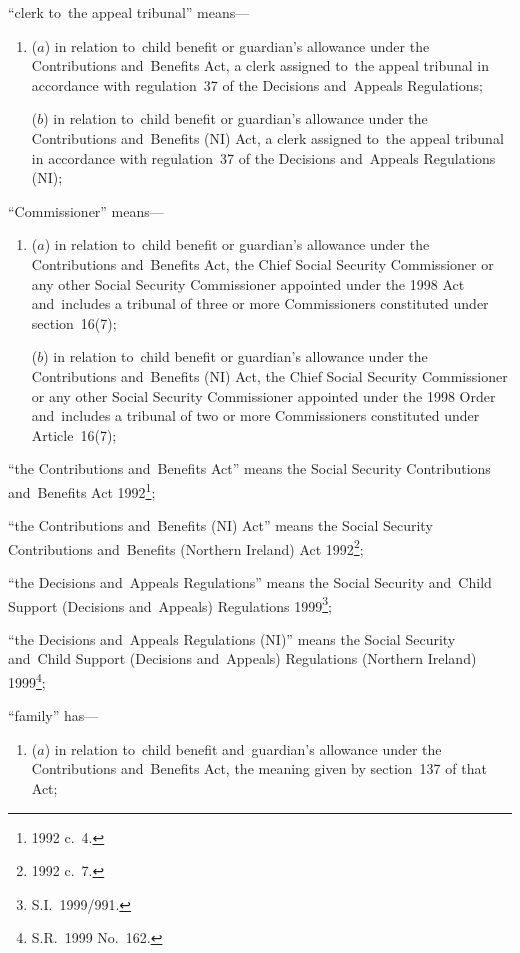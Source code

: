 \documentclass[12pt,a4paper]{article}
\begin{document}
\begin{enumerate}
\enlargethispage{-\baselineskip}

“clerk to~the appeal tribunal” means—
\begin{enumerate}\item[]
($a$) 
in relation to~child benefit or guardian’s allowance under the Contributions and~Benefits Act, a clerk assigned to~the appeal tribunal in accordance with regulation~37 of the Decisions and~Appeals Regulations;

($b$) 
in relation to~child benefit or guardian’s allowance under the Contributions and~Benefits (NI) Act, a clerk assigned to~the appeal tribunal in accordance with regulation~37 of the Decisions and~Appeals Regulations (NI);
\end{enumerate}

“Commissioner” means—
\begin{enumerate}\item[]
($a$) 
in relation to~child benefit or guardian’s allowance under the Contributions and~Benefits Act, the Chief Social Security Commissioner or any other Social Security Commissioner appointed under the 1998 Act and~includes a tribunal of three or more Commissioners constituted under section~16(7);

($b$) 
in relation to~child benefit or guardian’s allowance under the Contributions and~Benefits (NI) Act, the Chief Social Security Commissioner or any other Social Security Commissioner appointed under the 1998 Order and~includes a tribunal of two or more Commissioners constituted under Article~16(7);
\end{enumerate}

\enlargethispage{-\baselineskip}

“the Contributions and~Benefits Act” means the Social Security Contributions and~Benefits Act 1992\footnote{1992 c.~4.};

“the Contributions and~Benefits (NI) Act” means the Social Security Contributions and~Benefits (Northern Ireland) Act 1992\footnote{1992 c.~7.};

“the Decisions and~Appeals Regulations” means the Social Security and~Child Support (Decisions and~Appeals) Regulations 1999\footnote{S.I.~1999/991.};

“the Decisions and~Appeals Regulations (NI)” means the Social Security and~Child Support (Decisions and~Appeals) Regulations (Northern Ireland) 1999\footnote{S.R.~1999 No.~162.};

“family” has—
\begin{enumerate}\item[]
($a$) 
in relation to~child benefit and~guardian’s allowance under the Contributions and~Benefits Act, the meaning given by section~137 of that Act;


\end{enumerate}
\end{enumerate}
\end{document}
